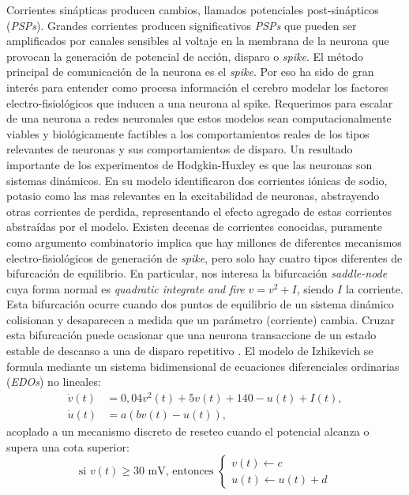 \documentclass[aps,prl,twocolumn,superscriptaddress]{revtex4-2}
\begin{document}
Corrientes sinápticas producen cambios, llamados potenciales post-sinápticos (\textit{PSPs}). Grandes corrientes producen significativos \textit{PSPs} que pueden ser amplificados por canales sensibles al voltaje en la membrana de la neurona que provocan la generación de potencial de acción, disparo o \textit{spike}. El método principal de comunicación de la neurona es el \textit{spike}.
Por eso ha sido de gran interés para entender como procesa información el cerebro modelar los factores electro-fisiológicos que inducen a una neurona al spike. Requerimos para escalar de una neurona a redes neuronales que estos modelos sean computacionalmente viables y biológicamente factibles a los comportamientos reales de los tipos relevantes de neuronas y sus comportamientos de disparo.
Un resultado importante de los experimentos de Hodgkin-Huxley es que las neuronas son sistemas dinámicos. En su modelo identificaron dos corrientes iónicas de sodio, potasio como las mas relevantes en la excitabilidad de neuronas, abstrayendo otras corrientes de perdida, representando el efecto agregado de estas corrientes abstraídas por el modelo.
Existen decenas de corrientes conocidas, puramente como argumento combinatorio implica que hay millones de diferentes mecanismos electro-fisiológicos de generación de \textit{spike}, pero solo hay cuatro tipos diferentes de bifurcación de equilibrio. En particular, nos interesa la bifurcación \textit{saddle-node} cuya forma normal es \textit{quadratic integrate and fire} $v=v^2+I$, siendo $I$ la corriente. Esta bifurcación ocurre cuando dos puntos de equilibrio de un sistema dinámico colisionan y desaparecen a medida que un parámetro (corriente) cambia. Cruzar esta bifurcación puede ocasionar que una neurona transaccione de un estado estable de descanso a una de disparo repetitivo \cite{izhikevich2007dynamical}.
El modelo de Izhikevich se formula mediante un sistema bidimensional de ecuaciones diferenciales ordinarias (\textit{EDOs}) no lineales:
\begin{align}
    \dot{v}(t) &= 0{,}04v^2(t) + 5v(t) + 140 - u(t) + I(t), \label{eq:izhi_v} \\
    \dot{u}(t) &= a (b v(t) - u(t)), \label{eq:izhi_u} 
\end{align}
acoplado a un mecanismo discreto de reseteo cuando el potencial alcanza o supera una cota superior:
\begin{equation}
    \text{si } v(t) \geq 30\text{ mV, entonces } 
    \begin{cases} 
        v(t) \leftarrow c \\ 
        u(t) \leftarrow u(t) + d 
    \end{cases} \label{eq:izhi_reset}
\end{equation}
\end{document}
